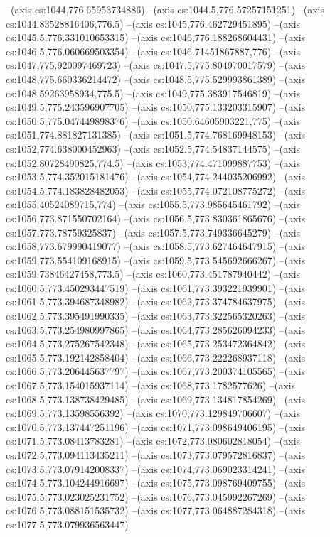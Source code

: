 --(axis cs:1044,776.65953734886)
--(axis cs:1044.5,776.57257151251)
--(axis cs:1044.83528816406,776.5)
--(axis cs:1045,776.462729451895)
--(axis cs:1045.5,776.331010653315)
--(axis cs:1046,776.188268604431)
--(axis cs:1046.5,776.060669503354)
--(axis cs:1046.71451867887,776)
--(axis cs:1047,775.920097469723)
--(axis cs:1047.5,775.804970017579)
--(axis cs:1048,775.660336214472)
--(axis cs:1048.5,775.529993861389)
--(axis cs:1048.59263958934,775.5)
--(axis cs:1049,775.383917546819)
--(axis cs:1049.5,775.243596907705)
--(axis cs:1050,775.133203315907)
--(axis cs:1050.5,775.047449898376)
--(axis cs:1050.64605903221,775)
--(axis cs:1051,774.881827131385)
--(axis cs:1051.5,774.768169948153)
--(axis cs:1052,774.638000452963)
--(axis cs:1052.5,774.54837144575)
--(axis cs:1052.80728490825,774.5)
--(axis cs:1053,774.471099887753)
--(axis cs:1053.5,774.352015181476)
--(axis cs:1054,774.244035206992)
--(axis cs:1054.5,774.183828482053)
--(axis cs:1055,774.072108775272)
--(axis cs:1055.40524089715,774)
--(axis cs:1055.5,773.985645461792)
--(axis cs:1056,773.871550702164)
--(axis cs:1056.5,773.830361865676)
--(axis cs:1057,773.78759325837)
--(axis cs:1057.5,773.749336645279)
--(axis cs:1058,773.679990419077)
--(axis cs:1058.5,773.627464647915)
--(axis cs:1059,773.554109168915)
--(axis cs:1059.5,773.545692666267)
--(axis cs:1059.73846427458,773.5)
--(axis cs:1060,773.451787940442)
--(axis cs:1060.5,773.450293447519)
--(axis cs:1061,773.393221939901)
--(axis cs:1061.5,773.394687348982)
--(axis cs:1062,773.374784637975)
--(axis cs:1062.5,773.395491990335)
--(axis cs:1063,773.322565320263)
--(axis cs:1063.5,773.254980997865)
--(axis cs:1064,773.285626094233)
--(axis cs:1064.5,773.275267542348)
--(axis cs:1065,773.253472364842)
--(axis cs:1065.5,773.192142858404)
--(axis cs:1066,773.222268937118)
--(axis cs:1066.5,773.206445637797)
--(axis cs:1067,773.200374105565)
--(axis cs:1067.5,773.154015937114)
--(axis cs:1068,773.1782577626)
--(axis cs:1068.5,773.138738429485)
--(axis cs:1069,773.134817854269)
--(axis cs:1069.5,773.13598556392)
--(axis cs:1070,773.129849706607)
--(axis cs:1070.5,773.137447251196)
--(axis cs:1071,773.098649406195)
--(axis cs:1071.5,773.08413783281)
--(axis cs:1072,773.080602818054)
--(axis cs:1072.5,773.094113435211)
--(axis cs:1073,773.079572816837)
--(axis cs:1073.5,773.079142008337)
--(axis cs:1074,773.069023314241)
--(axis cs:1074.5,773.104244916697)
--(axis cs:1075,773.098769409755)
--(axis cs:1075.5,773.023025231752)
--(axis cs:1076,773.045992267269)
--(axis cs:1076.5,773.088151535732)
--(axis cs:1077,773.064887284318)
--(axis cs:1077.5,773.079936563447)
